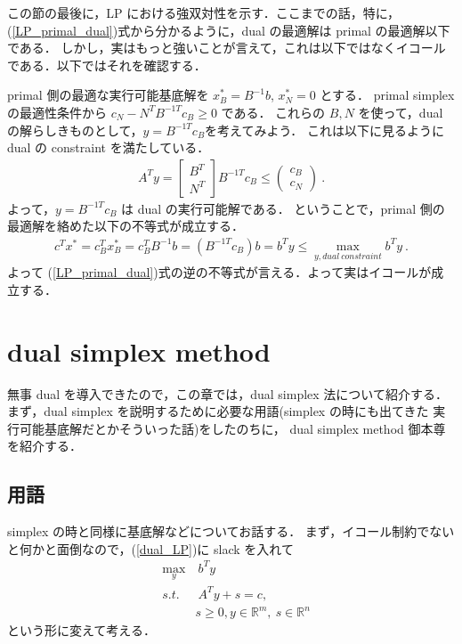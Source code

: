 \documentclass[11pt, a4]{article}
\begin{document}
この節の最後に，LP における強双対性を示す．ここまでの話，特に，
(\ref{LP_primal_dual})式から分かるように，dual の最適解は primal の最適解以下である．
しかし，実はもっと強いことが言えて，これは以下ではなくイコールである．以下ではそれを確認する．

primal 側の最適な実行可能基底解を $x_B^* = B^{-1}b$, $x_N^* = 0$ とする．
primal simplex の最適性条件から $c_N - N^TB^{-1 T}c_B \geq 0$ である．
これらの $B, N$ を使って，dual の解らしきものとして，$y = B^{-1 T} c_B$を考えてみよう．
これは以下に見るように dual の constraint を満たしている．
\begin{eqnarray}
  A^T y =
  \left[
    \begin{array}{c}
      B^T\nonumber\\
      N^T
    \end{array}
    \right]B^{-1T}c_B
  \leq
  \left(
  \begin{array}{c}
    c_B\nonumber\\
    c_N
  \end{array}
  \right)\ .
\end{eqnarray}
よって，$y = B^{-1 T}c_B$ は dual の実行可能解である．
ということで，primal 側の最適解を絡めた以下の不等式が成立する．
\begin{eqnarray}
  c^T x^* = c_B^T x^*_B = c_B^TB^{-1}b = (B^{-1 T}c_B) b = b^Ty \leq \max_{y, dual\ constraint} b^Ty\ .
\end{eqnarray}
よって (\ref{LP_primal_dual})式の逆の不等式が言える．よって実はイコールが成立する．

\section{dual simplex method}
無事 dual を導入できたので，この章では，dual simplex 法について紹介する．
まず，dual simplex を説明するために必要な用語(simplex の時にも出てきた 実行可能基底解だとかそういった話)をしたのちに，
dual simplex method 御本尊を紹介する．

\subsection{用語}
simplex の時と同様に基底解などについてお話する．
まず，イコール制約でないと何かと面倒なので，(\ref{dual_LP})に slack を入れて
\begin{eqnarray}
  &\max_{y}&\ b^Ty\nonumber\\
  &s.t.&\ A^Ty + s = c, \nonumber\\
  &\ & s\geq 0, y \in \mathbb{R}^m,\ s \in\mathbb{R}^n
\end{eqnarray}
という形に変えて考える．
\end{document}
